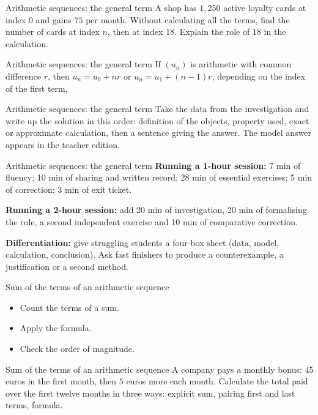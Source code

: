 \documentclass[aspectratio=169,10pt]{beamer}
\begin{document}
\begin{frame}{Arithmetic sequences: the general term}
A shop has \(1{,}250\) active loyalty cards at index \(0\) and gains \(75\) per month. Without calculating all the terms, find the number of cards at index \(n\), then at index \(18\). Explain the role of \(18\) in the calculation.
\end{frame}
\begin{frame}{Arithmetic sequences: the general term}
If \((u_n)\) is arithmetic with common difference \(r\), then \(u_n=u_0+nr\) or \(u_n=u_1+(n-1)r\), depending on the index of the first term.
\end{frame}
\begin{frame}{Arithmetic sequences: the general term}
Take the data from the investigation and write up the solution in this order: definition of the objects, property used, exact or approximate calculation, then a sentence giving the answer. The model answer appears in the teacher edition.
\end{frame}
\begin{frame}{Arithmetic sequences: the general term}
\textbf{Running a 1-hour session:} 7 min of fluency; 10 min of sharing and written record; 28 min of essential exercises; 5 min of correction; 3 min of exit ticket.

\textbf{Running a 2-hour session:} add 20 min of investigation, 20 min of formalising the rule, a second independent exercise and 10 min of comparative correction.

\textbf{Differentiation:} give struggling students a four-box sheet (data, model, calculation, conclusion). Ask fast finishers to produce a counterexample, a justification or a second method.
\end{frame}
\begin{frame}{Sum of the terms of an arithmetic sequence}
\begin{itemize}
\item Count the terms of a sum.
\item Apply the formula.
\item Check the order of magnitude.

\end{itemize}
\end{frame}
\begin{frame}{Sum of the terms of an arithmetic sequence}
A company pays a monthly bonus: \(45\) euros in the first month, then \(5\) euros more each month. Calculate the total paid over the first twelve months in three ways: explicit sum, pairing first and last terms, formula.
\end{frame}
\end{document}
